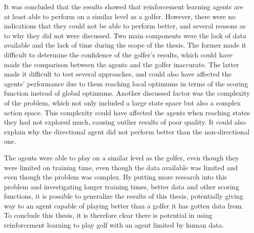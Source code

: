 \documentclass{kththesis}
\begin{document}
It was concluded that the results showed that reinforcement learning agents are at least able to perform on a similar level as a golfer. However, there were no indications that they could not be able to perform better, and several reasons as to why they did not were discussed. Two main components were the lack of data available and the lack of time during the scope of the thesis. The former made it difficult to determine the confidence of the golfer's results, which could have made the comparison between the agents and the golfer inaccurate. The latter made it difficult to test several approaches, and could also have affected the agents' performance due to them reaching local optimums in terms of the scoring function instead of global optimums. Another discussed factor was the complexity of the problem, which not only included a large state space but also a complex action space. This complexity could have affected the agents when reaching states they had not explored much, causing outlier results of poor quality. It could also explain why the directional agent did not perform better than the non-directional one.

The agents were able to play on a similar level as the golfer, even though they were limited on training time, even though the data available was limited and even though the problem was complex. By putting more research into this problem and investigating longer training times, better data and other scoring functions, it is possible to generalize the results of this thesis, potentially giving way to an agent capable of playing better than a golfer it has gotten data from. To conclude this thesis, it is therefore clear there is potential in using reinforcement learning to play golf with an agent limited by human data.

\printbibliography[heading=bibintoc]

\appendix
\end{document}
